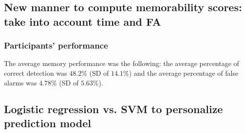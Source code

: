\documentclass[sigconf]{acmart}
\begin{document}



\subsection{New manner to compute memorability scores: take into account time and FA}



\subsubsection{Participants' performance}
The average memory performance was the following: the average percentage of correct detection was $48.2\%$ (SD of $14.1\%$) and the average percentage of false alarms was $4.78\%$ (SD of $5.63\%$).


\subsection{Logistic regression vs. SVM to personalize prediction model}




\end{document}
